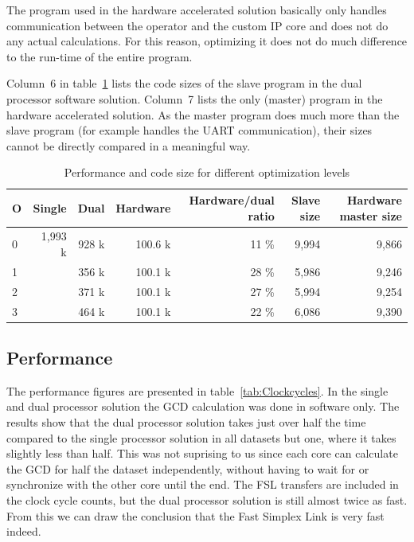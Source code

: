 \documentclass[11pt]{article}
\begin{document}
The program used in the hardware accelerated solution basically only handles communication between the operator and the custom IP core and does not do any actual calculations. For this reason, optimizing it does not do much difference to the run-time of the entire program.

Column~6 in table~\ref{tab:opt} lists the code sizes of the slave program in the dual processor software solution. Column~7 lists the only (master) program in the hardware accelerated solution. As the master program does much more than the slave program (for example handles the UART communication), their sizes cannot be directly compared in a meaningful way.

\begin{table}[htbp]
  \centering
  \begin{tabular}{l|rrrrrr}
    \toprule
    O & Single  & Dual  & Hardware  & Hardware/dual ratio & Slave size & Hardware master size \\
    \midrule
    0 & 1,993 k & 928 k & 100.6 k & 11 \% & 9,994 & 9,866 \\
    1 &         & 356 k & 100.1 k & 28 \% & 5,986 & 9,246 \\
    2 &         & 371 k & 100.1 k & 27 \% & 5,994 & 9,254 \\
    3 &         & 464 k & 100.1 k & 22 \% & 6,086 & 9,390 \\
    \bottomrule
  \end{tabular}
  \caption{Performance and code size for different optimization levels}
  \label{tab:opt}
\end{table}

\subsection{Performance}
The performance figures are presented in table~\ref{tab:Clockcycles}. In the single and dual processor solution the GCD calculation was done in software only. The results show that the dual processor solution takes just over half the time compared to the single processor solution in all datasets but one, where it takes slightly less than half. This was not suprising to us since each core can calculate the GCD for half the dataset independently, without having to wait for or synchronize with the other core until the end. The FSL transfers are included in the clock cycle counts, but the dual processor solution is still almost twice as fast. From this we can draw the conclusion that the Fast Simplex Link is very fast indeed.
\end{document}
